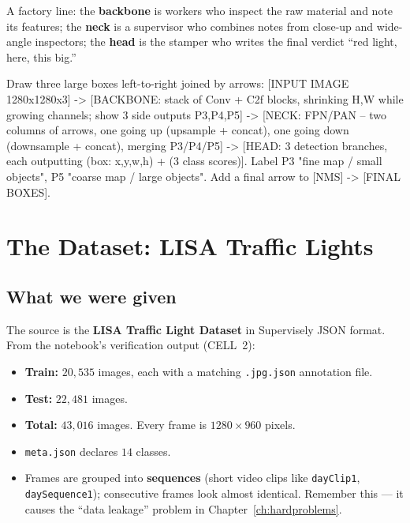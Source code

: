 \begin{analogy}
A factory line: the \textbf{backbone} is workers who inspect the raw
material and note its features; the \textbf{neck} is a supervisor who
combines notes from close-up and wide-angle inspectors; the
\textbf{head} is the stamper who writes the final verdict ``red light,
here, this big.''
\end{analogy}

\begin{diagramprompt}
Draw three large boxes left-to-right joined by arrows:
[INPUT IMAGE 1280x1280x3] -> [BACKBONE: stack of Conv + C2f blocks,
shrinking H,W while growing channels; show 3 side outputs P3,P4,P5] ->
[NECK: FPN/PAN -- two columns of arrows, one going up (upsample + concat),
one going down (downsample + concat), merging P3/P4/P5] ->
[HEAD: 3 detection branches, each outputting (box: x,y,w,h) + (3 class
scores)]. Label P3 "fine map / small objects", P5 "coarse map / large
objects". Add a final arrow to [NMS] -> [FINAL BOXES].
\end{diagramprompt}


\chapter{The Dataset: LISA Traffic Lights}
\label{ch:data}

\section{What we were given}
The source is the \textbf{LISA Traffic Light Dataset} in Supervisely
JSON format. From the notebook's verification output (CELL~2):
\begin{itemize}
  \item \textbf{Train:} $20{,}535$ images, each with a matching
        \texttt{.jpg.json} annotation file.
  \item \textbf{Test:} $22{,}481$ images.
  \item \textbf{Total:} $43{,}016$ images. Every frame is
        $1280\times960$ pixels.
  \item \texttt{meta.json} declares $14$ classes.
  \item Frames are grouped into \textbf{sequences} (short video clips
        like \texttt{dayClip1}, \texttt{daySequence1}); consecutive
        frames look almost identical. Remember this --- it causes the
        ``data leakage'' problem in Chapter~\ref{ch:hardproblems}.
\end{itemize}


